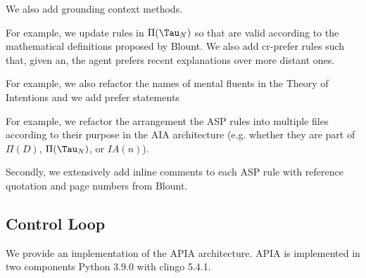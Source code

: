 We also add grounding context methods.

For example, we update rules in $\Pi(\Tau_N)$ so that are valid according to the mathematical definitions proposed by Blount.
We also add cr-prefer rules such that, given an, the agent prefers recent explanations over more distant ones.

For example, we also refactor the names of mental fluents in the Theory of Intentions and we add prefer statements

For example, we refactor the arrangement the ASP rules into multiple files according to their purpose in the AIA architecture (e.g. whether they are part of $\Pi(D)$, $\Pi(\Tau_N)$, or $IA(n)$).

Secondly, we extensively add inline comments to each ASP rule with reference quotation and page numbers from Blount.

\subsection{Control Loop}

We provide an implementation of the APIA architecture.
APIA is implemented in two components Python 3.9.0 with clingo 5.4.1.
